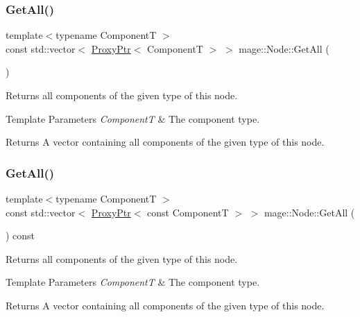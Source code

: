 \subsubsection{\texorpdfstring{Get\+All()}{GetAll()}\hspace{0.1cm}{\footnotesize\ttfamily [1/2]}}
{\footnotesize\ttfamily template$<$typename ComponentT $>$ \\
const std\+::vector$<$ \hyperlink{classmage_1_1_proxy_ptr}{Proxy\+Ptr}$<$ ComponentT $>$ $>$ mage\+::\+Node\+::\+Get\+All (\begin{DoxyParamCaption}{ }\end{DoxyParamCaption})}

Returns all components of the given type of this node.


\begin{DoxyTemplParams}{Template Parameters}
{\em ComponentT} & The component type. \\
\hline
\end{DoxyTemplParams}
\begin{DoxyReturn}{Returns}
A vector containing all components of the given type of this node. 
\end{DoxyReturn}
\hypertarget{classmage_1_1_node_a920ff966a7f970189fcbae86025ab3aa}{}\label{classmage_1_1_node_a920ff966a7f970189fcbae86025ab3aa} 
\subsubsection{\texorpdfstring{Get\+All()}{GetAll()}\hspace{0.1cm}{\footnotesize\ttfamily [2/2]}}
{\footnotesize\ttfamily template$<$typename ComponentT $>$ \\
const std\+::vector$<$ \hyperlink{classmage_1_1_proxy_ptr}{Proxy\+Ptr}$<$ const ComponentT $>$ $>$ mage\+::\+Node\+::\+Get\+All (\begin{DoxyParamCaption}{ }\end{DoxyParamCaption}) const}

Returns all components of the given type of this node.


\begin{DoxyTemplParams}{Template Parameters}
{\em ComponentT} & The component type. \\
\hline
\end{DoxyTemplParams}
\begin{DoxyReturn}{Returns}
A vector containing all components of the given type of this node. 
\end{DoxyReturn}
\hypertarget{classmage_1_1_node_a69d5c613982a4dfd5175538aff6a07a5}{}\label{classmage_1_1_node_a69d5c613982a4dfd5175538aff6a07a5} 
